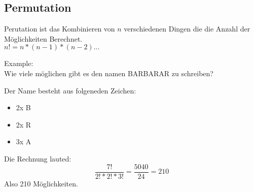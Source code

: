 \subsection{Permutation}

Perutation ist das Kombinieren von $n$ verschiedenen Dingen die die Anzahl der Möglichkeiten Berechnet.\\

$n! = n*(n-1)*(n-2)...$



\hfill \break
Example:\\
Wie viele möglichen gibt es den namen BARBARAR zu schreiben?

\hfill \break
Der Name besteht aus folgeneden Zeichen:
\begin{itemize}
    \item 2x B
    \item 2x R
    \item 3x A
\end{itemize}

\hfill \break
Die Rechnung lauted:\\

$$\frac{7!}{2!*2!*3!} = \frac{5040}{24} = 210$$ Also 210 Möglichkeiten.